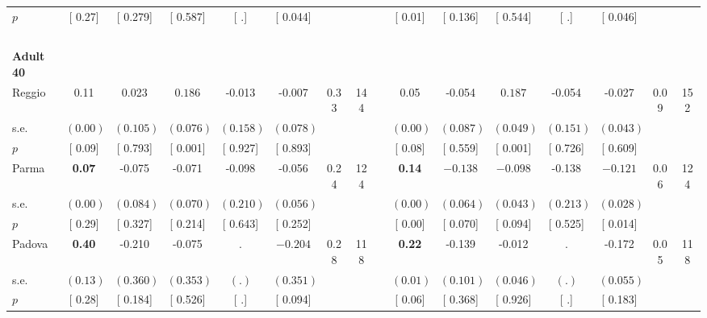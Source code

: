 \begin{longtable}{L{8em} c c c c c c c p{1em} c c c c c c c}
\quad \quad \quad \quad $ p$ & [     0.27] & [    0.279] & [    0.587] & [        .] & [    0.044] & & & & [     0.01] & [    0.136] & [    0.544] & [        .] & [    0.046] & &  \\[1em]
~\\[1em]
\quad \quad \textbf{Adult 40} & & & & & & & & & & & & & & & \\* 
\quad \quad \quad Reggio& 0.11 &     0.023 & $ \mathbf{    0.186}$ &    -0.013 &    -0.007 &      0.33 &       144 & & 0.05 &    -0.054 & $ \mathbf{    0.187}$ &    -0.054 &    -0.027 &      0.09 &       152  \\*
\quad \quad \quad \quad s.e.& $ (     0.00)$ & $ (    0.105)$ & $ (    0.076)$ & $ (    0.158)$ & $ (    0.078)$ & & & & $ (     0.00)$ & $ (    0.087)$ & $ (    0.049)$ & $ (    0.151)$ & $ (    0.043)$ & &  \\*
\quad \quad \quad \quad $ p$ & [     0.09] & [    0.793] & [    0.001] & [    0.927] & [    0.893] & & & & [     0.08] & [    0.559] & [    0.001] & [    0.726] & [    0.609] & &  \\[1em]
\quad \quad \quad Parma& \textbf{     0.07} &    -0.075 &    -0.071 &    -0.098 &    -0.056 &      0.24 &       124 & & \textbf{     0.14} & $ \mathbf{   -0.138}$ & $ \mathbf{   -0.098}$ &    -0.138 & $ \mathbf{   -0.121}$ &      0.06 &       124  \\*
\quad \quad \quad \quad s.e.& $ (     0.00)$ & $ (    0.084)$ & $ (    0.070)$ & $ (    0.210)$ & $ (    0.056)$ & & & & $ (     0.00)$ & $ (    0.064)$ & $ (    0.043)$ & $ (    0.213)$ & $ (    0.028)$ & &  \\*
\quad \quad \quad \quad $ p$ & [     0.29] & [    0.327] & [    0.214] & [    0.643] & [    0.252] & & & & [     0.00] & [    0.070] & [    0.094] & [    0.525] & [    0.014] & &  \\[1em]
\quad \quad \quad Padova& \textbf{     0.40} &    -0.210 &    -0.075 &         . & $ \mathbf{   -0.204}$ &      0.28 &       118 & & \textbf{     0.22} &    -0.139 &    -0.012 &         . &    -0.172 &      0.05 &       118  \\*
\quad \quad \quad \quad s.e.& $ (     0.13)$ & $ (    0.360)$ & $ (    0.353)$ & $ (        .)$ & $ (    0.351)$ & & & & $ (     0.01)$ & $ (    0.101)$ & $ (    0.046)$ & $ (        .)$ & $ (    0.055)$ & &  \\*
\quad \quad \quad \quad $ p$ & [     0.28] & [    0.184] & [    0.526] & [        .] & [    0.094] & & & & [     0.06] & [    0.368] & [    0.926] & [        .] & [    0.183] & &  \\[1em]

\end{longtable}
